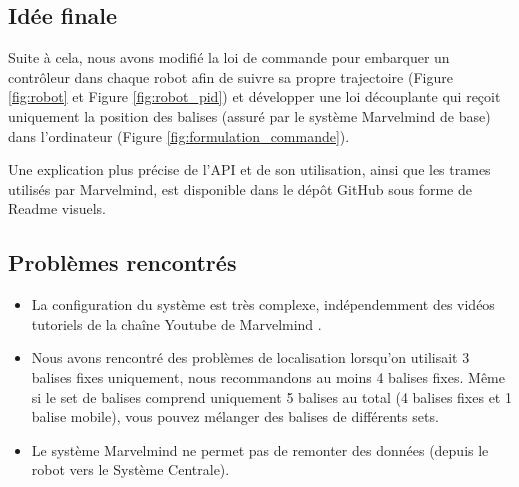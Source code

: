 \subsection{Idée finale}
Suite à cela, nous avons modifié la loi de commande pour embarquer un contrôleur dans chaque robot afin de suivre sa propre trajectoire (Figure \ref{fig:robot} et Figure \ref{fig:robot_pid}) et développer une loi découplante qui reçoit uniquement la position des balises (assuré par le système Marvelmind de base) dans l'ordinateur (Figure \ref{fig:formulation_commande}). 

Une explication plus précise de l'API et de son utilisation, ainsi que les trames utilisés par Marvelmind, est disponible dans le dépôt GitHub sous forme de Readme visuels. 
\subsection{Problèmes rencontrés}
\begin{itemize}
    \item La configuration du système est très complexe, indépendemment des vidéos tutoriels de la chaîne Youtube de Marvelmind \cite{marvelmind-youtube}. 
    \item Nous avons rencontré des problèmes de localisation lorsqu'on utilisait 3 balises fixes uniquement, nous recommandons au moins 4 balises fixes. Même si le set de balises comprend uniquement 5 balises au total (4 balises fixes et 1 balise mobile), vous pouvez mélanger des balises de différents sets. 
    \item Le système Marvelmind ne permet pas de remonter des données (depuis le robot vers le Système Centrale).
\end{itemize}